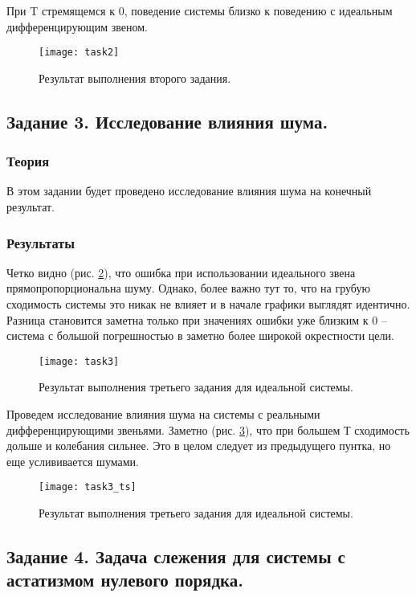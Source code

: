 \documentclass[16pt]{article}
\begin{document}
При T стремящемся к 0, поведение системы близко к поведению с идеальным дифференцирующим звеном.
\begin{figure}[h!]
    \centering
    \texttt{[image: task2]}
    \caption{Результат выполнения второго задания.}
    \label{fig:fig2}
\end{figure}

\pagebreak

\subsection{Задание 3. Исследование влияния шума.}

\subsubsection{Теория}
В этом задании будет проведено исследование влияния шума на конечный результат.
\subsubsection{Результаты}
Четко видно (рис. \ref{fig:fig3}), что ошибка при использовании идеального звена прямопропорциональна шуму. Однако, более важно тут то, что на грубую сходимость системы это никак не влияет и в начале графики выглядят идентично. Разница становится заметна только при значениях ошибки уже близким к 0 -- система с большой погрешностью в заметно более широкой окрестности цели.
\begin{figure}[h!]
    \centering
    \texttt{[image: task3]}
    \caption{Результат выполнения третьего задания для идеальной системы.}
    \label{fig:fig3}
\end{figure}

Проведем исследование влияния шума на системы с реальными дифференцирующими звеньями.
Заметно (рис. \ref{fig:fig33}), что при большем Т сходимость дольше и колебания сильнее. Это в целом следует из предыдущего пунтка, но еще услививается шумами.
\begin{figure}[h!]
    \centering
    \texttt{[image: task3\_ts]}
    \caption{Результат выполнения третьего задания для идеальной системы.}
    \label{fig:fig33}
\end{figure}
\pagebreak

\subsection{Задание 4. Задача слежения для системы с астатизмом нулевого порядка.}
\end{document}
